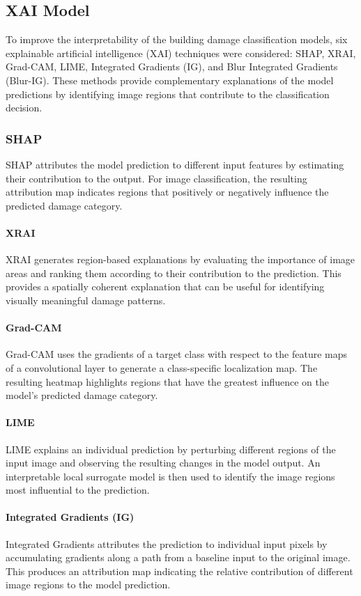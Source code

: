 \documentclass[conference]{IEEEtran}
\begin{document}
{{\subsection{XAI Model}
To improve the interpretability of the building damage classification models, six explainable artificial intelligence (XAI) techniques were considered: SHAP, XRAI, Grad-CAM, LIME, Integrated Gradients (IG), and Blur Integrated Gradients (Blur-IG). These methods provide complementary explanations of the model predictions by identifying image regions that contribute to the classification decision.
\subsubsection{SHAP}
SHAP attributes the model prediction to different input features by estimating their contribution to the output. For image classification, the resulting attribution map indicates regions that positively or negatively influence the predicted damage category.
\paragraph{XRAI}
XRAI generates region-based explanations by evaluating the importance of image areas and ranking them according to their contribution to the prediction. This provides a spatially coherent explanation that can be useful for identifying visually meaningful damage patterns.
\paragraph{Grad-CAM}
Grad-CAM uses the gradients of a target class with respect to the feature maps of a convolutional layer to generate a class-specific localization map. The resulting heatmap highlights regions that have the greatest influence on the model's predicted damage category.
\paragraph{LIME}
LIME explains an individual prediction by perturbing different regions of the input image and observing the resulting changes in the model output. An interpretable local surrogate model is then used to identify the image regions most influential to the prediction.
\paragraph{Integrated Gradients (IG)}
Integrated Gradients attributes the prediction to individual input pixels by accumulating gradients along a path from a baseline input to the original image. This produces an attribution map indicating the relative contribution of different image regions to the model prediction.
}}
\end{document}
